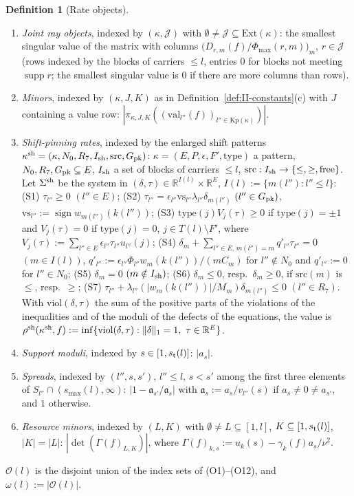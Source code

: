 \documentclass[10pt]{amsart}
\theoremstyle{definition}
\newtheorem{definition}[theorem]{Definition}
\theoremstyle{remark}
\newcommand{\supp}{\operatorname{supp}}
\newcommand{\sgn}{\operatorname{sign}}
\newcommand{\R}{\mathbb R}
\begin{document}
\begin{definition}[Rate objects]
\begin{enumerate}
($:=\infty$ if $I_{\rm up}\cup I_{\rm lo}=\emptyset$).
\item[(O7)] \emph{Joint ray objects}, indexed by $(\kappa,\mathcal J)$
with $\emptyset\ne\mathcal J\subseteq\mathrm{Ext}(\kappa)$: the smallest
singular value of the matrix with columns
$\big(D_{r,m}(f)/\Phi_{\max}(r,m)\big)_m$, $r\in\mathcal J$ (rows indexed
by the blocks of carriers $\le l$, entries $0$ for blocks not meeting
$\supp r$; the smallest singular value is $0$ if there are more columns
than rows).
\item[(O8)] \emph{Minors}, indexed by $(\kappa,J,K)$ as in
Definition~\ref{def:II-constants}(c) with $J$ containing a value row:
$|\pi_{\kappa,J,K}((\mathrm{val}_{l''}(f))_{l''\in\mathrm{Kp}(\kappa)})|$.
\item[(O9)] \emph{Shift-pinning rates}, indexed by the enlarged shift
patterns $\kappa^{\rm sh}=(\kappa,N_0,R_7,\allowbreak I_{\rm sh},\mathrm{src},
\allowbreak G_{\rm pk})$: $\kappa=(E,P,\epsilon,F',\mathrm{type})$ a pattern,
$N_0,R_7,G_{\rm pk}\subseteq E$, $I_{\rm sh}$ a set of blocks of carriers
$\le l$, $\mathrm{src}:I_{\rm sh}\to\{\le,\ge,\text{free}\}$.  Let
$\Sigma^{\rm sh}$ be the system in $(\delta,\tau)\in\R^{I(l)}\times\R^E$,
$I(l):=\{m(l''):l''\le l\}$:
(S1) $\tau_{l''}\ge0$ $(l''\in E)$;
(S2) $\tau_{l''}=\epsilon_{l''}\mathrm{vs}_{l''}\lambda_{l''}
\delta_{m(l'')}$ $(l''\in G_{\rm pk})$, $\mathrm{vs}_{l''}:=\sgn
w_{m(l'')}(k(l''))$;
(S3) $\mathrm{type}(j)V_j(\tau)\ge0$ if $\mathrm{type}(j)=\pm1$ and
$V_j(\tau)=0$ if $\mathrm{type}(j)=0$, $j\in T(l)\setminus F'$, where
$V_j(\tau):=\sum_{l''\in E}\epsilon_{l''}\tau_{l''}u_{l''}(j)$;
(S4) $\delta_m+\sum_{l''\in E,\,m(l'')=m}q'_{l''}\tau_{l''}=0$ $(m\in I(l))$,
$q'_{l''}:=\epsilon_{l''}\Phi_{l''}w_m(k(l''))/(mC_m)$ for $l''\notin N_0$
and $q'_{l''}:=0$ for $l''\in N_0$;
(S5) $\delta_m=0$ $(m\notin I_{\rm sh})$;
(S6) $\delta_m\le0$, resp.\ $\delta_m\ge0$, if $\mathrm{src}(m)$ is $\le$,
resp.\ $\ge$;
(S7) $\tau_{l''}+\lambda_{l''}(|w_m(k(l''))|/M_m)\delta_{m(l'')}\le0$
$(l''\in R_7)$.
With $\mathrm{viol}(\delta,\tau)$ the sum of the positive parts of the
violations of the inequalities and of the moduli of the defects of the
equations, the value is
$\rho^{\rm sh}(\kappa^{\rm sh},f):=\inf\{\mathrm{viol}(\delta,\tau):
\|\delta\|_1=1,\ \tau\in\R^E\}$.
\item[(O10)] \emph{Support moduli}, indexed by $s\in[1,s_{\rm t}(l)]$:
$|a_s|$.
\item[(O11)] \emph{Spreads}, indexed by $(l'',s,s')$, $l''\le l$, $s<s'$
among the first three elements of $S_{l''}\cap(s_{\max}(l),\infty)$:
$|1-\mathfrak a_{s'}/\mathfrak a_s|$ with $\mathfrak a_s:=a_s/v_{l''}(s)$ if
$a_s\ne0\ne a_{s'}$, and $1$ otherwise.
\item[(O12)] \emph{Resource minors}, indexed by $(L,K)$ with
$\emptyset\ne L\subseteq[1,l]$, $K\subseteq[1,s_{\rm t}(l)]$, $|K|=|L|$:
$|\det(\Gamma(f)_{L,K})|$, where
$\Gamma(f)_{k,s}:=u_k(s)-\gamma_k(f)a_s/\nu^2$.
\end{enumerate}
$\mathcal O(l)$ is the disjoint union of the index sets of
(O1)--(O12), and $\omega(l):=|\mathcal O(l)|$.
\end{definition}
\end{document}
